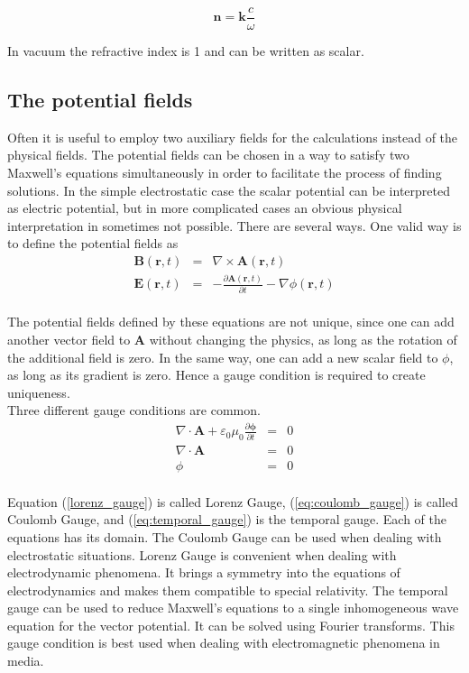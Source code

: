 \documentclass[a4paper,11pt]{thesis}
\begin{document}
\begin{equation}\label{eq:ref_index}
    \mathbf{n}=\mathbf{k}\frac{c}{\omega}
\end{equation}

In vacuum the refractive index is 1 and can be written as scalar.

\subsection{The potential fields}
Often it is useful to employ two auxiliary fields for the calculations instead of the physical fields. The potential fields can be chosen in a way to satisfy two Maxwell's equations simultaneously in order to facilitate the process of finding solutions. In the simple electrostatic case the scalar potential can be interpreted as electric potential, but in more complicated cases an obvious physical interpretation in sometimes not possible. There are several ways. One valid way is to define the potential fields as\\

\begin{eqnarray}
\mathbf{B}(\mathbf{r},t)&=&\nabla \times \mathbf{A}(\mathbf{r},t) \label{rule_B}\\
\mathbf{E}(\mathbf{r},t)&=&-\frac{\partial \mathbf{A}(\mathbf{r},t)}{\partial t}-\nabla \phi(\mathbf{r},t) \label{rule_E}
\end{eqnarray}\\

The potential fields defined by these equations are not unique, since one can add another vector field to \textbf{A} without changing the physics, as long as the rotation of the additional field is zero. In the same way, one can add a new scalar field to $\phi$, as long as its gradient is zero. Hence a gauge condition is required to create uniqueness.\\

Three different gauge conditions are common.\\

\begin{eqnarray}\label{lorenz_gauge}
\nabla \cdot \mathbf{A}+\varepsilon_0 \mu_0\frac{\partial \mathbf{\phi}}{\partial t}&=&0\\
\nabla \cdot \mathbf{A}&=&0\label{eq:coulomb_gauge}\\
\phi&=&0\label{eq:temporal_gauge}
\end{eqnarray}\\

Equation (\ref{lorenz_gauge}) is called Lorenz Gauge, (\ref{eq:coulomb_gauge}) is called Coulomb Gauge, and (\ref{eq:temporal_gauge}) is the temporal gauge. Each of the equations has its domain. The Coulomb Gauge can be used when dealing with electrostatic situations. Lorenz Gauge is convenient when dealing with electrodynamic phenomena. It brings a symmetry into the equations of electrodynamics and makes them compatible to special relativity. The temporal gauge can be used to reduce Maxwell's equations to a single inhomogeneous wave equation for the vector potential. It can be solved using Fourier transforms. This gauge condition is best used when dealing with electromagnetic phenomena in media.\\
\end{document}
